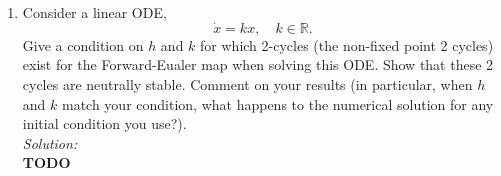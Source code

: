\documentclass[10pt]{amsart}
\theoremstyle{nonumberplain}
\begin{document}
\begin{enumerate}[label={\bf {\arabic*}:}]
\begin{enumerate}
\textit{Solution:} \\
A condition for which we would see such oscillations would be if $f^\prime(x_n^*) = -\frac{2}{h}x_n$.
This would imply that $f(x_n) \sim -\frac 2 h x_n$ and the Forward Euler map would be
\begin{align*}
x_{n + 1} &= x_n + hf(x_n) \\
x_{n + 1} &= x_n - h\frac{2}{h}x_n \\
x_{n + 1} &= x_n - 2x_n \\
x_{n + 1} &= - x_n.
\end{align*}
Which is analogous to oscillations that we are looking for.
I would say it is common to see oscillations with Forward Euler because we are using it to look for a fixed point, but the $h$ that we are choosing depends on the value of the derivative evaluated at that fixed point so it's kind of a chicken or the egg thing.
We can't find the precise value of $h$ we should use to guarantee the stability of the fixed point because we don't know where the fixed point is yet. \\
\qed \\

\item Consider a linear ODE, 
\begin{equation}
\dot x = kx, \quad k \in \mathbb R.
\label{eq:eq4}
\end{equation}
Give a condition on $h$ and $k$ for which 2-cycles (the non-fixed point 2 cycles) exist for the Forward-Eualer map when solving this ODE.
Show that these 2 cycles are neutrally stable.
Comment on your results (in particular, when $h$ and $k$ match your condition, what happens to the numerical solution for any initial condition you use?). \\

\textit{Solution:} \\
\textbf{TODO} \\

\end{enumerate}
\end{enumerate}
\end{document}
